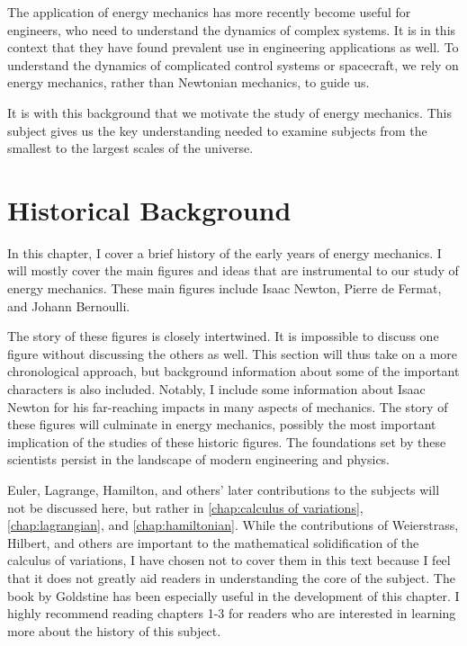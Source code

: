 The application of energy mechanics has more recently become useful for engineers, who need to understand the dynamics of complex systems. It is in this context that they have found prevalent use in engineering applications as well. To understand the dynamics of complicated control systems or spacecraft, we rely on energy mechanics, rather than Newtonian mechanics, to guide us.

It is with this background that we motivate the study of energy mechanics. This subject gives us the key understanding needed to examine subjects from the smallest to the largest scales of the universe.

\chapter{Historical Background }\label{sec: historical background}

In this chapter, I cover a brief history of the early years of energy mechanics. I will mostly cover the main figures and ideas that are instrumental to our study of energy mechanics. These main figures include Isaac Newton, Pierre de Fermat, and Johann Bernoulli.

The story of these figures is closely intertwined. It is impossible to discuss one figure without discussing the others as well. This section will thus take on a more chronological approach, but background information about some of the important characters is also included. Notably, I include some information about Isaac Newton for his far-reaching impacts in many aspects of mechanics. The story of these figures will culminate in energy mechanics, possibly the most important implication of the studies of these historic figures. The foundations set by these scientists persist in the landscape of modern engineering and physics. 

Euler, Lagrange, Hamilton, and others' later contributions to the subjects will not be discussed here, but rather in \autoref{chap:calculus of variations}, \autoref{chap:lagrangian}, and \autoref{chap:hamiltonian}. While the contributions of Weierstrass, Hilbert, and others are important to the mathematical solidification of the calculus of variations, I have chosen not to cover them in this text because I feel that it does not greatly aid readers in understanding the core of the subject. The book by Goldstine \cite{goldstine_history_1980} has been especially useful in the development of this chapter. I highly recommend reading chapters 1-3 for readers who are interested in learning more about the history of this subject.

